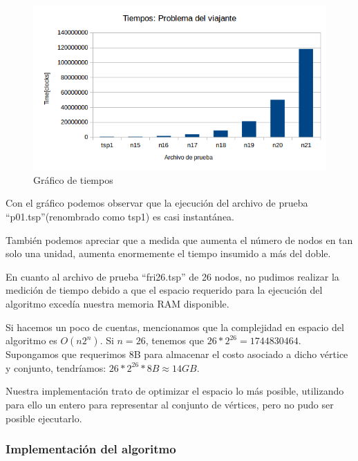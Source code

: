 \begin{figure}[H]
\centering
\includegraphics[width=\textwidth]{ProblemaDelViajante/tiempos.png}
\caption{Gráfico de tiempos}
\end{figure}

Con el gráfico podemos observar que la ejecución del archivo de prueba ``p01.tsp''(renombrado como tsp1) es casi instantánea.

También podemos apreciar que a medida que aumenta el número de nodos en tan solo una unidad, aumenta enormemente el tiempo insumido a más del doble.

En cuanto al archivo de prueba ``fri26.tsp'' de 26 nodos, no pudimos realizar la medición de tiempo debido a que el espacio requerido para la ejecución del 
algoritmo excedía nuestra memoria RAM disponible.

Si hacemos un poco de cuentas, mencionamos que la complejidad en espacio del algoritmo es $O(n 2^n)$.
Si $n = 26$, tenemos que $26 * 2^{26} = 1744830464$. Supongamos que requerimos 8B para almacenar el costo asociado a dicho vértice y conjunto, tendríamos: $26 * 2^{26} * 8B \approx 14GB$.

Nuestra implementación trato de optimizar el espacio lo más posible, utilizando para ello un entero para representar al conjunto de vértices, pero no pudo ser posible ejecutarlo.
\newpage
\subsubsection{Implementación del algoritmo}







